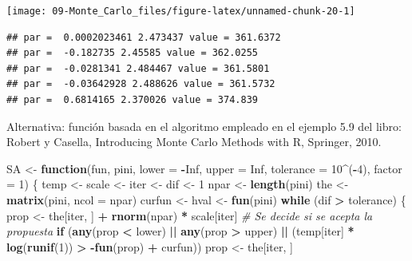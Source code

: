 \documentclass[
]{book}
\newenvironment{Shaded}{\begin{snugshade}}{\end{snugshade}}
\newcommand{\CommentTok}[1]{\textcolor[rgb]{0.56,0.35,0.01}{\textit{#1}}}
\newcommand{\ControlFlowTok}[1]{\textcolor[rgb]{0.13,0.29,0.53}{\textbf{#1}}}
\newcommand{\DataTypeTok}[1]{\textcolor[rgb]{0.13,0.29,0.53}{#1}}
\newcommand{\DecValTok}[1]{\textcolor[rgb]{0.00,0.00,0.81}{#1}}
\newcommand{\KeywordTok}[1]{\textcolor[rgb]{0.13,0.29,0.53}{\textbf{#1}}}
\newcommand{\NormalTok}[1]{#1}
\newcommand{\OperatorTok}[1]{\textcolor[rgb]{0.81,0.36,0.00}{\textbf{#1}}}
\newcommand{\OtherTok}[1]{\textcolor[rgb]{0.56,0.35,0.01}{#1}}
\newcommand{\StringTok}[1]{\textcolor[rgb]{0.31,0.60,0.02}{#1}}
\theoremstyle{break}
\theoremstyle{definition}
\theoremstyle{definition}
\theoremstyle{definition}
\theoremstyle{remark}
\begin{document}
\begin{center}\texttt{[image: 09-Monte\_Carlo\_files/figure-latex/unnamed-chunk-20-1]} \end{center}

\begin{verbatim}
## par =  0.0002023461 2.473437 value = 361.6372 
## par =  -0.182735 2.45585 value = 362.0255 
## par =  -0.0281341 2.484467 value = 361.5801 
## par =  -0.03642928 2.488626 value = 361.5732 
## par =  0.6814165 2.370026 value = 374.839
\end{verbatim}

Alternativa: función basada en el algoritmo empleado en el ejemplo 5.9 del libro:
Robert y Casella, Introducing Monte Carlo Methods with R, Springer, 2010.

\begin{Shaded}
\begin{Highlighting}[]
\NormalTok{SA <-}\StringTok{ }\ControlFlowTok{function}\NormalTok{(fun, pini, }\DataTypeTok{lower =} \OperatorTok{-}\OtherTok{Inf}\NormalTok{, }\DataTypeTok{upper =} \OtherTok{Inf}\NormalTok{, }\DataTypeTok{tolerance =} \DecValTok{10}\OperatorTok{^}\NormalTok{(}\OperatorTok{-}\DecValTok{4}\NormalTok{), }\DataTypeTok{factor =} \DecValTok{1}\NormalTok{) \{}
\NormalTok{  temp <-}\StringTok{ }\NormalTok{scale <-}\StringTok{ }\NormalTok{iter <-}\StringTok{ }\NormalTok{dif <-}\StringTok{ }\DecValTok{1}
\NormalTok{  npar <-}\StringTok{ }\KeywordTok{length}\NormalTok{(pini) }
\NormalTok{  the <-}\StringTok{ }\KeywordTok{matrix}\NormalTok{(pini, }\DataTypeTok{ncol =}\NormalTok{ npar)}
\NormalTok{  curfun <-}\StringTok{ }\NormalTok{hval <-}\StringTok{ }\KeywordTok{fun}\NormalTok{(pini)}
  \ControlFlowTok{while}\NormalTok{ (dif }\OperatorTok{>}\StringTok{ }\NormalTok{tolerance) \{}
\NormalTok{    prop <-}\StringTok{ }\NormalTok{the[iter, ] }\OperatorTok{+}\StringTok{ }\KeywordTok{rnorm}\NormalTok{(npar) }\OperatorTok{*}\StringTok{ }\NormalTok{scale[iter]}
    \CommentTok{# Se decide si se acepta la propuesta}
    \ControlFlowTok{if}\NormalTok{ (}\KeywordTok{any}\NormalTok{(prop }\OperatorTok{<}\StringTok{ }\NormalTok{lower) }\OperatorTok{||}\StringTok{ }\KeywordTok{any}\NormalTok{(prop }\OperatorTok{>}\StringTok{ }\NormalTok{upper) }\OperatorTok{||}\StringTok{ }
\StringTok{        }\NormalTok{(temp[iter] }\OperatorTok{*}\StringTok{ }\KeywordTok{log}\NormalTok{(}\KeywordTok{runif}\NormalTok{(}\DecValTok{1}\NormalTok{)) }\OperatorTok{>}\StringTok{ }\OperatorTok{-}\KeywordTok{fun}\NormalTok{(prop) }\OperatorTok{+}\StringTok{ }\NormalTok{curfun))  prop <-}\StringTok{ }\NormalTok{the[iter, ]}

\end{Highlighting}
\end{Shaded}
\end{document}
